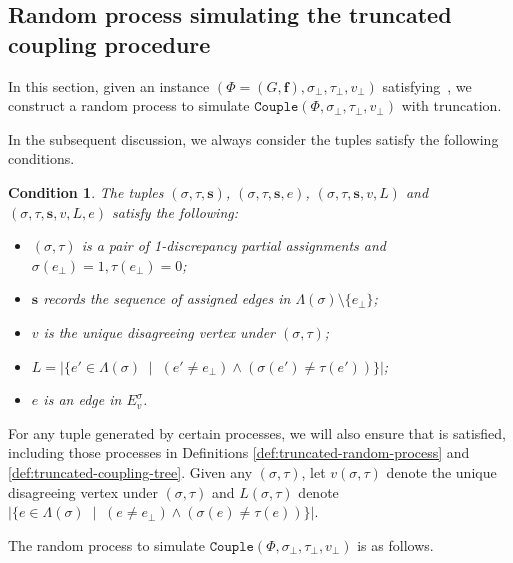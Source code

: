 \documentclass[11pt]{article}
\newtheorem{condition}{Condition}
\newcommand{\abs}[1]{\left\vert#1\right\vert}
\renewcommand{\mid}{\;\middle\vert\;} \newcommand{\cmid}{\,:\,}
\def\!#1{\mathtt{#1}}
\newcommand{\vecf}{\boldsymbol{f}}
\newcommand{\seqS}{\boldsymbol{s}}
\begin{document}
    

\subsection{Random process simulating the truncated coupling procedure}

In this section, given an instance $(\Phi = (G, \vecf), \sigma_\bot, \tau_\bot, v_\bot)$ satisfying~, we construct a random process to simulate $\!{Couple}(\Phi, \sigma_\bot, \tau_\bot, v_\bot)$ with truncation. 

In the subsequent discussion, we always consider the tuples satisfy the following conditions.
\begin{condition}\label{condition-sigma-tau}
The tuples $(\sigma,\tau,\seqS)$, $(\sigma,\tau,\seqS,e)$,  $(\sigma,\tau,\seqS, v, L)$ and $(\sigma,\tau,\seqS, v, L,e)$ satisfy the following:
\begin{itemize}
\item $(\sigma, \tau)$ is a pair of 1-discrepancy partial assignments and $\sigma(e_\bot) = 1, \tau(e_\bot) = 0$;
\item $\seqS$ records the sequence of assigned edges in $\Lambda(\sigma)\setminus \{e_\bot\}$;
\item $v$ is the unique disagreeing vertex under $(\sigma, \tau)$;
\item $L = \abs{\{e'\in \Lambda(\sigma)\mid (e'\neq e_{\bot})\land (\sigma(e')\neq \tau(e'))\}}$;
\item $e$ is an edge in $E^{\sigma}_v$.
\end{itemize}
\end{condition}
For any tuple generated by certain processes, we will also ensure that  is satisfied, including those processes in Definitions  \ref{def:truncated-random-process} and \ref{def:truncated-coupling-tree}.
Given any $(\sigma,\tau)$, let $v(\sigma,\tau)$ denote the unique disagreeing vertex under $(\sigma, \tau)$ and $L(\sigma,\tau)$ denote $\abs{\{e\in \Lambda(\sigma)\mid (e\neq e_{\bot})\land (\sigma(e)\neq \tau(e))\}}$.

    


The random process to simulate $\!{Couple}(\Phi, \sigma_\bot, \tau_\bot, v_\bot)$ is as follows.
\end{document}
